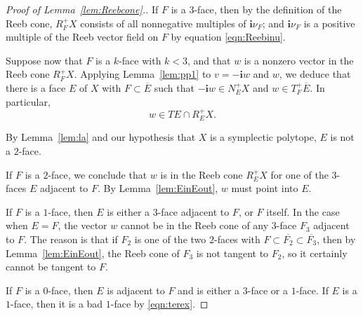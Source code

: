 \begin{proof}[Proof of Lemma~\ref{lem:Reebcone}.]
If $F$ is a $3$-face, then by the definition of the Reeb cone, $R_F^+X$ consists of all nonnegative multiples of ${\mathbf i}\nu_F$; and ${\mathbf i}\nu_F$ is a positive multiple of the Reeb vector field on $F$ by equation \eqref{eqn:Reebinu}.

Suppose now that $F$ is a $k$-face with $k<3$, and that $w$ is a nonzero vector in the Reeb cone $R_F^+X$. Applying Lemma~\ref{lem:pp1} to $v=-{\mathbf i}w$ and $w$, we deduce that there is a face $E$ of $X$ with $F\subset \overline{E}$ such that $-{\mathbf i}w\in N_E^+X$ and $w\in T_F^+\overline{E}$. In particular,
\begin{equation}
\label{eqn:terex}
w\in TE\cap R_E^+X.
\end{equation}

By Lemma~\ref{lem:la} and our hypothesis that $X$ is a symplectic polytope, $E$ is not a $2$-face.

If $F$ is a $2$-face, we conclude that $w$ is in the Reeb cone $R_E^+X$ for one of the $3$-faces $E$ adjacent to $F$. By Lemma~\ref{lem:EinEout}, $w$ must point into $E$.

If $F$ is a $1$-face, then $E$ is either a $3$-face adjacent to $F$, or $F$ itself. In the case when $E=F$, the vector $w$ cannot be in the Reeb cone of any $3$-face $F_3$ adjacent to $F$. The reason is that if $F_2$ is one of the two $2$-faces with $F \subset \overline{F_2} \subset \overline{F_3}$, then by Lemma~\ref{lem:EinEout}, the Reeb cone of $F_3$ is not tangent to $F_2$, so it certainly cannot be tangent to $F$.

If $F$ is a $0$-face, then $E$ is adjacent to $F$ and is either a $3$-face or a $1$-face. If $E$ is a $1$-face, then it is a bad $1$-face by \eqref{eqn:terex}.
\end{proof}
























